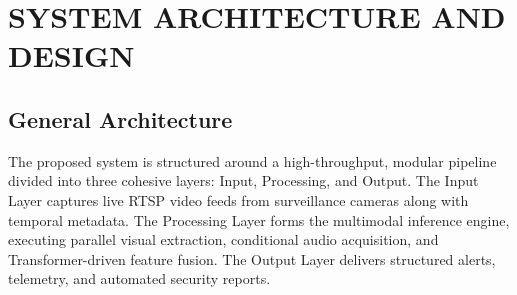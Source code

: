 \documentclass[11pt,a4paper]{article}
\begin{document}
	\newpage
	\section{SYSTEM ARCHITECTURE AND DESIGN}
	
	\subsection{General Architecture}
	The proposed system is structured around a high-throughput, modular pipeline divided into three cohesive layers: Input, Processing, and Output. The Input Layer captures live RTSP video feeds from surveillance cameras along with temporal metadata. The Processing Layer forms the multimodal inference engine, executing parallel visual extraction, conditional audio acquisition, and Transformer-driven feature fusion. The Output Layer delivers structured alerts, telemetry, and automated security reports.
	
	\vspace{0.4em}
	
\end{document}
